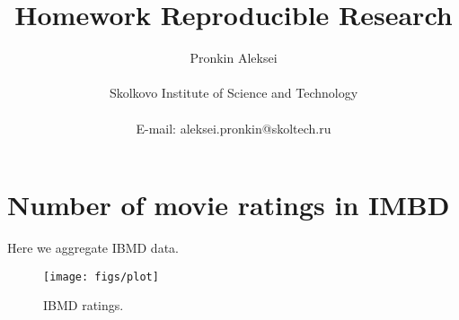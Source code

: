 \documentclass[12pt]{article}
\title{Homework Reproducible Research}
\author
{Pronkin Aleksei\\
\\
\normalsize{Skolkovo Institute of Science and Technology}\\
\\
\normalsize{E-mail:  aleksei.pronkin@skoltech.ru}
}
\date{}
\begin{document}
 

\maketitle 

\newpage

\section{Number of movie ratings in IMBD}

Here we aggregate IBMD data.

\begin{figure}[ht]
    \centering
    \texttt{[image: figs/plot]}
    \caption{IBMD ratings.}
\end{figure}
\end{document}
